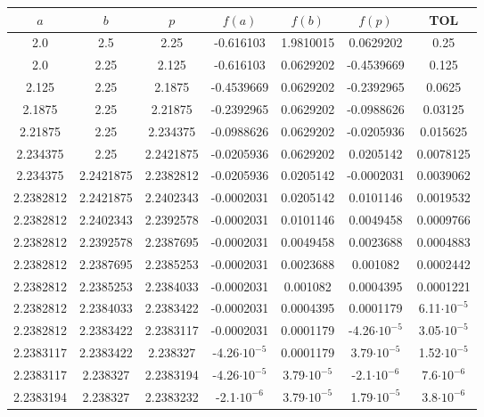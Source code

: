 \documentclass[12pt]{article}
\begin{document}
\begin{enumerate}
\begin{enumerate}
\begin{itemize}
            \begin{center}
            \begin{tabular}{|c|c|c|c|c|c|c|}
            \hline
            \(a\) & \(b\)& \(p\)&\(f(a)\) & \(f(b)\) & \(f(p)\)&\textbf{TOL} \\
            \hline
            2.0 & 2.5 & 2.25 & -0.616103 & 1.9810015 & 0.0629202 & 0.25 \\
            2.0 & 2.25 & 2.125 & -0.616103 & 0.0629202 & -0.4539669 & 0.125 \\
            2.125 & 2.25 & 2.1875 & -0.4539669 & 0.0629202 & -0.2392965 & 0.0625 \\
            2.1875 & 2.25 & 2.21875 & -0.2392965 & 0.0629202 & -0.0988626 & 0.03125 \\
            2.21875 & 2.25 & 2.234375 & -0.0988626 & 0.0629202 & -0.0205936 & 0.015625 \\
            2.234375 & 2.25 & 2.2421875 & -0.0205936 & 0.0629202 & 0.0205142 & 0.0078125 \\
            2.234375 & 2.2421875 & 2.2382812 & -0.0205936 & 0.0205142 & -0.0002031 & 0.0039062 \\
            2.2382812 & 2.2421875 & 2.2402343 & -0.0002031 & 0.0205142 & 0.0101146 & 0.0019532 \\
            2.2382812 & 2.2402343 & 2.2392578 & -0.0002031 & 0.0101146 & 0.0049458 & 0.0009766 \\
            2.2382812 & 2.2392578 & 2.2387695 & -0.0002031 & 0.0049458 & 0.0023688 & 0.0004883 \\
            2.2382812 & 2.2387695 & 2.2385253 & -0.0002031 & 0.0023688 & 0.001082 & 0.0002442 \\
            2.2382812 & 2.2385253 & 2.2384033 & -0.0002031 & 0.001082 & 0.0004395 & 0.0001221 \\
            2.2382812 & 2.2384033 & 2.2383422 & -0.0002031 & 0.0004395 & 0.0001179 & 6.11\(\cdot 10^{-5}\) \\
            2.2382812 & 2.2383422 & 2.2383117 & -0.0002031 & 0.0001179 & -4.26\(\cdot 10^{-5}\) & 3.05\(\cdot 10^{-5}\) \\
            2.2383117 & 2.2383422 & 2.238327 & -4.26\(\cdot 10^{-5}\) & 0.0001179 & 3.79\(\cdot 10^{-5}\) & 1.52\(\cdot 10^{-5}\) \\
            2.2383117 & 2.238327 & 2.2383194 & -4.26\(\cdot 10^{-5}\) & 3.79\(\cdot 10^{-5}\) & -2.1\(\cdot 10^{-6}\) & 7.6\(\cdot 10^{-6}\) \\
            2.2383194 & 2.238327 & 2.2383232 & -2.1\(\cdot 10^{-6}\) & 3.79\(\cdot 10^{-5}\) & 1.79\(\cdot 10^{-5}\) & 3.8\(\cdot 10^{-6}\) \\

\end{tabular}
\end{center}
\end{itemize}
\end{enumerate}
\end{enumerate}
\end{document}

